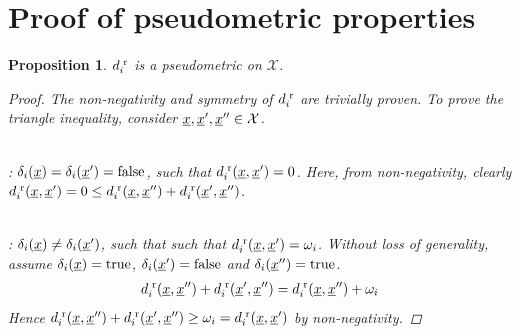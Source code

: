 \documentclass{article}
\newcommand{\vect}[1]{\underline{\smash{#1}}}
\renewcommand{\v}[1]{\vect{#1}}
\newcommand{\sX}{\mathcal{X}}
\newcommand{\br}{^{\text{\textnormal{ r}}}}
\newtheorem{prop}[thm]{Proposition}
\begin{document}
\section{Proof of pseudometric properties}

\begin{prop}
  $d\br_i$ is a pseudometric on $\sX$. \label{prop:dbr_pseudometric}
\begin{proof}
The non-negativity and symmetry of $d\br_i$ are trivially proven. To prove the triangle inequality, consider $\v{x}, \v{x}', \v{x}'' \in \sX$. 

~\\: $\delta_i(\v{x}) = \delta_i(\v{x}') = \textrm{false}$, such that $d\br_i(\v{x},\v{x}') = 0$. Here, from non-negativity, clearly $d\br_i(\v{x},\v{x}') = 0 \leq d\br_i(\v{x},\v{x}'') + d\br_i(\v{x}',\v{x}'')$.

~\\: $\delta_i(\v{x}) \neq \delta_i(\v{x}')$, such that such that  $d\br_i(\v{x},\v{x}') = \omega_i$.  Without loss of generality, assume $\delta_i(\v{x}) = \text{true}$, $\delta_i(\v{x}') = \text{false}$ and $\delta_i(\v{x}'') = \text{true}$. 
\begin{align}
d\br_i(\v{x},\v{x}'') + d\br_i(\v{x}',\v{x}'') = d\br_i(\v{x},\v{x}'')  + \omega_i
\end{align}
Hence $d\br_i(\v{x},\v{x}'') + d\br_i(\v{x}',\v{x}'') \geq \omega_i = d\br_i(\v{x},\v{x}')$ by non-negativity.


\end{proof}
\end{prop}
\end{document}
